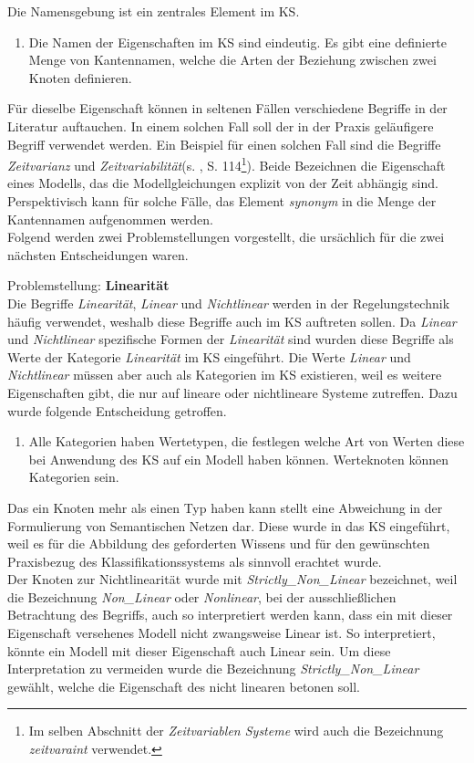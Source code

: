 Die Namensgebung ist ein zentrales Element im KS.
\begin{enumerate}[resume*]
	\item \label{E.KS_Namensgebung}Die Namen der Eigenschaften im KS sind eindeutig. Es gibt eine definierte Menge von Kantennamen, welche die Arten der Beziehung zwischen zwei Knoten definieren.
\end{enumerate}
Für dieselbe Eigenschaft können in seltenen Fällen verschiedene Begriffe in der Literatur auftauchen. In einem solchen Fall soll der in der Praxis geläufigere Begriff verwendet werden. Ein Beispiel für einen solchen Fall sind die Begriffe \textit{Zeitvarianz} und \textit{Zeitvariabilität}(s. \cite{LUN10}, S. 114\footnote{Im selben Abschnitt der \textit{Zeitvariablen Systeme} wird auch die Bezeichnung \textit{zeitvaraint} verwendet.}). Beide Bezeichnen die Eigenschaft eines Modells, das die Modellgleichungen explizit von der Zeit abhängig sind. Perspektivisch kann für solche Fälle, das Element \textit{synonym} in die Menge der Kantennamen aufgenommen werden.\\
Folgend werden zwei Problemstellungen vorgestellt, die ursächlich für die zwei nächsten Entscheidungen waren.

Problemstellung: \textbf{Linearität}\\
Die Begriffe \textit{Linearität}, \textit{Linear} und \textit{Nichtlinear} werden in der Regelungstechnik häufig verwendet, weshalb diese Begriffe auch im KS auftreten sollen. Da \textit{Linear} und \textit{Nichtlinear} spezifische Formen der \textit{Linearität} sind wurden diese Begriffe als Werte der Kategorie \textit{Linearität} im KS eingeführt. Die Werte \textit{Linear} und \textit{Nichtlinear} müssen aber auch als Kategorien im KS existieren, weil es weitere Eigenschaften gibt, die nur auf lineare oder nichtlineare Systeme zutreffen. Dazu wurde folgende Entscheidung getroffen.
\begin{enumerate}[resume*]
	\item \label{E.KS_Werteknoten}Alle Kategorien haben Wertetypen, die festlegen welche Art von Werten diese bei Anwendung des KS auf ein Modell haben können. Werteknoten können Kategorien sein.
\end{enumerate}
Das ein Knoten mehr als einen Typ haben kann stellt eine Abweichung in der Formulierung von Semantischen Netzen dar. Diese wurde in das KS eingeführt, weil es für die Abbildung des geforderten Wissens und für den gewünschten Praxisbezug des Klassifikationssystems als sinnvoll erachtet wurde.\\
Der Knoten zur Nichtlinearität wurde mit \textit{Strictly\_Non\_Linear} bezeichnet, weil die Bezeichnung \textit{Non\_Linear} oder \textit{Nonlinear}, bei der ausschließlichen Betrachtung des Begriffs, auch so interpretiert werden kann, dass ein mit dieser Eigenschaft versehenes Modell nicht zwangsweise Linear ist. So interpretiert, könnte ein Modell mit dieser Eigenschaft auch Linear sein. Um diese Interpretation zu vermeiden wurde die Bezeichnung \textit{Strictly\_Non\_Linear} gewählt, welche die Eigenschaft des nicht linearen betonen soll.\\ 

